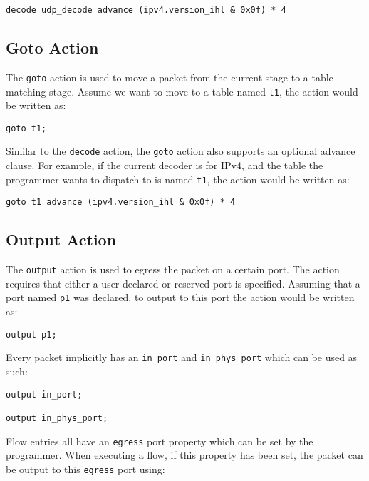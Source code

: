 \begin{lstlisting}
decode udp_decode advance (ipv4.version_ihl & 0x0f) * 4
\end{lstlisting}

\subsection{Goto Action} \label{goto_action_tut}

The \texttt{goto} action is used to move a packet from the current stage to a table matching stage. Assume we want to move to a table named \texttt{t1}, the action would be written as:

\begin{lstlisting}
goto t1;
\end{lstlisting}

Similar to the \texttt{decode} action, the \texttt{goto} action also supports an optional advance clause. For example, if the current decoder is for IPv4, and the table the programmer wants to dispatch to is named \texttt{t1}, the action would be written as:

\begin{lstlisting}
goto t1 advance (ipv4.version_ihl & 0x0f) * 4
\end{lstlisting}

\subsection{Output Action} \label{output_action_tut}

The \texttt{output} action is used to egress the packet on a certain port. The action requires that either a user-declared or reserved port is specified. Assuming that a port named \texttt{p1} was declared, to output to this port the action would be written as:

\begin{lstlisting}
output p1;
\end{lstlisting}

Every packet implicitly has an \texttt{in\_port} and \texttt{in\_phys\_port} which can be used as such:

\begin{lstlisting}
output in_port;

output in_phys_port;
\end{lstlisting}

Flow entries all have an \texttt{egress} port property which can be set by the programmer. When executing a flow, if this property has been set, the packet can be output to this \texttt{egress} port using:

